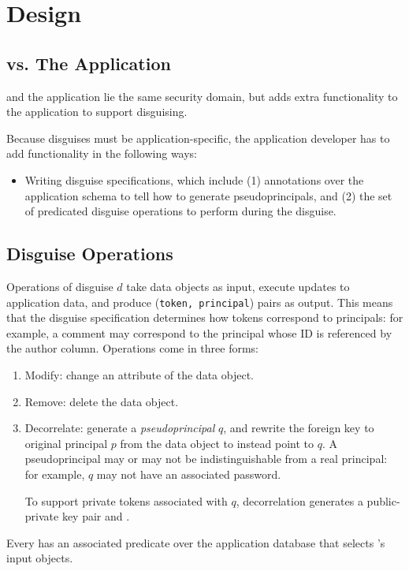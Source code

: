\section{Design} 

\subsection{\sys vs. The Application} 
\sys and the application lie the same security domain, but \sys adds extra functionality to the
application to support disguising.

Because disguises must be application-specific, the application developer has to add functionality
in the following ways:
\begin{itemize}
    \item Writing disguise specifications, which include (1) annotations over the application schema
        to tell \sys how to generate pseudoprincipals, and (2) the set of predicated disguise operations to
        perform during the disguise.
\end{itemize}

\subsection{Disguise Operations} 
Operations  of disguise $d$ take data objects as input, execute updates to application data,
and produce (\texttt{token, principal}) pairs as output. This means that the disguise specification
determines how tokens correspond to principals: for example, a comment may correspond to the
principal whose ID is referenced by the author column.  
%
Operations come in three forms:
\begin{enumerate}
    \item Modify: change an attribute of the data object.
    \item Remove: delete the data object.
    \item Decorrelate: generate a \emph{pseudoprincipal} $q$, and rewrite the foreign key to original
        principal $p$ from the data object to instead point to $q$.
        A pseudoprincipal may or may not be indistinguishable from a real principal: for example,
        $q$ may not have an associated password.

        To support private tokens associated with $q$, decorrelation generates a
        public-private key pair  and .
\end{enumerate}
Every  has an associated predicate over the application database that selects 's input objects.

